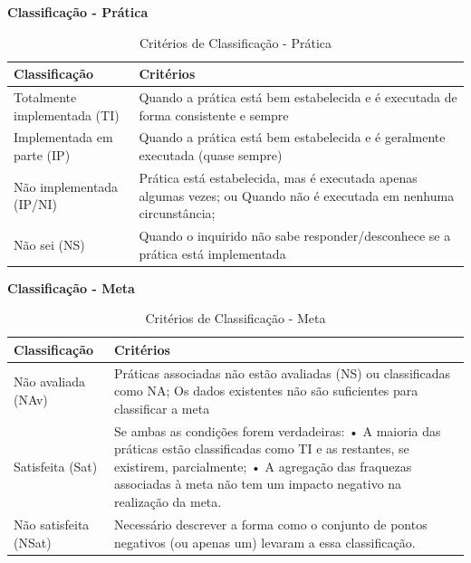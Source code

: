 \documentclass[openany,10pt,a4paper]{article}
\begin{document}
\begin{appendix}
\begin{table}[H]
	\textbf{Classificação - Prática}
		\centering
		\caption{Critérios de Classificação - Prática}
		\begin{tabular}{|p{1in}p{5in}|}		
			\hline
			\textbf{Classificação}  & \textbf{Critérios}\\ 
			\hline
			Totalmente implementada	(TI) & Quando a prática está bem estabelecida e é executada de forma
			consistente e sempre \\
			\hline
			Implementada em parte (IP) & Quando a prática está bem estabelecida e é geralmente executada
			(quase sempre) \\
			\hline
			Não implementada (IP/NI) & Prática está estabelecida, mas é executada apenas algumas vezes; ou
			Quando não é executada em nenhuma circunstância; \\
			\hline
			Não sei (NS) & Quando o inquirido não sabe responder/desconhece se a prática está
			implementada \\
			\hline
		\end{tabular} 
\end{table}

\begin{table}[H]
	\textbf{Classificação - Meta}
		\centering
		\caption{Critérios de Classificação - Meta}
		\begin{tabular}{|p{1in}p{5in}|}		
			\hline
			\textbf{Classificação}  & \textbf{Critérios}\\ 
			\hline
			Não avaliada (NAv) & Práticas associadas não estão avaliadas (NS) ou classificadas como NA;
			Os dados existentes não são suficientes para classificar a meta \\
			\hline
			Satisfeita (Sat) & Se ambas as condições forem verdadeiras:
			• A maioria das práticas estão classificadas como TI e as restantes,
			se existirem, parcialmente;
			• A agregação das fraquezas associadas à meta não tem um impacto
			negativo na realização da meta.	 \\
			\hline
			Não satisfeita (NSat) & Necessário descrever a forma como o conjunto de pontos negativos
			(ou apenas um) levaram a essa classificação. \\
			\hline
		\end{tabular} 
\end{table}


\end{appendix}
\end{document}
